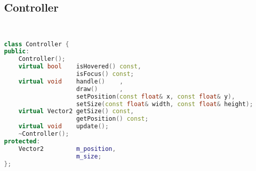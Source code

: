 \subsection{Controller}
\begin{lstlisting}[language=C++]


class Controller {
public:
    Controller();
    virtual bool    isHovered() const,
                    isFocus() const;
    virtual void    handle()    ,
                    draw()      ,
                    setPosition(const float& x, const float& y),
                    setSize(const float& width, const float& height);
    virtual Vector2 getSize() const,
                    getPosition() const;
    virtual void    update();
    ~Controller();
protected:
    Vector2         m_position,
                    m_size;
};






\end{lstlisting}
